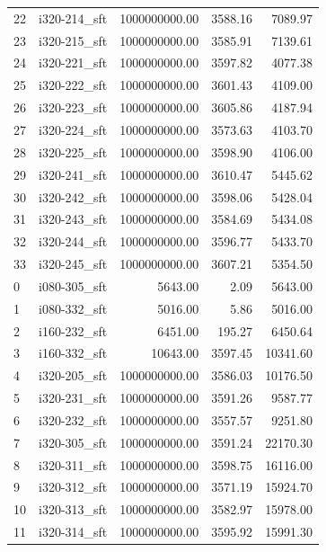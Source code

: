 \begin{tabular}{llrrr}
22 &  i320-214\_sft & 1000000000.00 &           3588.16 &     7089.97 \\
23 &  i320-215\_sft & 1000000000.00 &           3585.91 &     7139.61 \\
24 &  i320-221\_sft & 1000000000.00 &           3597.82 &     4077.38 \\
25 &  i320-222\_sft & 1000000000.00 &           3601.43 &     4109.00 \\
26 &  i320-223\_sft & 1000000000.00 &           3605.86 &     4187.94 \\
27 &  i320-224\_sft & 1000000000.00 &           3573.63 &     4103.70 \\
28 &  i320-225\_sft & 1000000000.00 &           3598.90 &     4106.00 \\
29 &  i320-241\_sft & 1000000000.00 &           3610.47 &     5445.62 \\
30 &  i320-242\_sft & 1000000000.00 &           3598.06 &     5428.04 \\
31 &  i320-243\_sft & 1000000000.00 &           3584.69 &     5434.08 \\
32 &  i320-244\_sft & 1000000000.00 &           3596.77 &     5433.70 \\
33 &  i320-245\_sft & 1000000000.00 &           3607.21 &     5354.50 \\
0  &  i080-305\_sft &       5643.00 &              2.09 &     5643.00 \\
1  &  i080-332\_sft &       5016.00 &              5.86 &     5016.00 \\
2  &  i160-232\_sft &       6451.00 &            195.27 &     6450.64 \\
3  &  i160-332\_sft &      10643.00 &           3597.45 &    10341.60 \\
4  &  i320-205\_sft & 1000000000.00 &           3586.03 &    10176.50 \\
5  &  i320-231\_sft & 1000000000.00 &           3591.26 &     9587.77 \\
6  &  i320-232\_sft & 1000000000.00 &           3557.57 &     9251.80 \\
7  &  i320-305\_sft & 1000000000.00 &           3591.24 &    22170.30 \\
8  &  i320-311\_sft & 1000000000.00 &           3598.75 &    16116.00 \\
9  &  i320-312\_sft & 1000000000.00 &           3571.19 &    15924.70 \\
10 &  i320-313\_sft & 1000000000.00 &           3582.97 &    15978.00 \\
11 &  i320-314\_sft & 1000000000.00 &           3595.92 &    15991.30 \\

\end{tabular}
